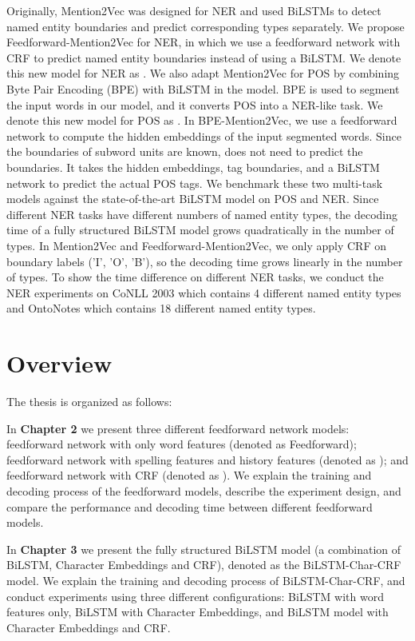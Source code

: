\begin{enumerate}
Originally, Mention2Vec was designed for NER and used BiLSTMs to detect named entity boundaries and predict corresponding types separately. We propose Feedforward-Mention2Vec for NER, in which we use a feedforward network with CRF to predict named entity boundaries instead of using a BiLSTM.  We denote this new model for NER as \ma. We also adapt Mention2Vec for POS by combining Byte Pair Encoding (BPE) with BiLSTM in the model. BPE is used to segment the input words in our model, and it converts POS into a NER-like task. We denote this new model for POS as \mb. In BPE-Mention2Vec, we use a feedforward network to compute the hidden embeddings of the input segmented words. Since the boundaries of subword units are known, \mb{} does not need to predict the boundaries. It takes the hidden embeddings, tag boundaries, and a BiLSTM network to predict the actual POS tags. We benchmark these two multi-task models against the state-of-the-art BiLSTM model on POS and NER. Since different NER tasks have different numbers of named entity types, the decoding time of a fully structured BiLSTM model grows quadratically in the number of types. In Mention2Vec and Feedforward-Mention2Vec, we only apply CRF on boundary labels ('I', 'O', 'B'), so the decoding time grows linearly in the number of types. To show the time difference on different NER tasks, we conduct the NER experiments on CoNLL 2003 which contains 4 different named entity types and OntoNotes which contains 18 different named entity types.

\end{enumerate}


\section{Overview}
The thesis is organized as follows:

In \textbf{Chapter 2}  we present three different feedforward network models: feedforward network with only word features (denoted as Feedforward); feedforward network with spelling features and history features (denoted as \ffa); and feedforward network with CRF (denoted as \ffb). We explain the training and decoding process of the feedforward models, describe the experiment design, and compare the performance and decoding time between different feedforward models.

In \textbf{Chapter 3} we present the fully structured BiLSTM model (a combination of BiLSTM, Character Embeddings and CRF), denoted as the BiLSTM-Char-CRF model. We explain the training and decoding process of BiLSTM-Char-CRF, and conduct experiments using three different configurations: BiLSTM with word features only, BiLSTM with Character Embeddings, and BiLSTM model with Character Embeddings and CRF.

